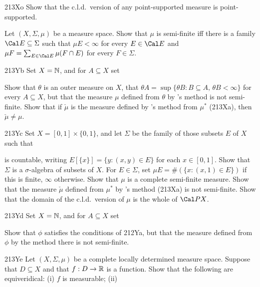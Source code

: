 {\spheader 213Xo Show that the c.l.d.\ version of any point-supported
measure is point-supported.

Let $(X,\Sigma,\mu)$ be a measure space.   Show that $\mu$
is semi-finite iff there is a family $\Cal E\subseteq\Sigma$ such that
$\mu E<\infty$ for every $E\in\Cal E$ and
$\mu F=\sum_{E\in\Cal E}\mu(F\cap E)$ for every $F\in\Sigma$.

\spheader 213Yb
Set $X=\Bbb N$, and for $A\subseteq X$ set


\noindent Show that $\theta$ is an outer measure on $X$, that
$\theta A=\sup\{\theta B:B\subseteq A,\,\theta B<\infty\}$ for every
$A\subseteq X$, but that the measure $\mu$ defined from $\theta$ by
\Caratheodory's
method is not semi-finite.   Show that if $\check\mu$ is the measure
defined by \Caratheodory's method from $\mu^*$ (213Xa), then
$\check\mu\ne\mu$.

\spheader 213Yc Set $X=[0,1]\times\{0,1\}$, and let
$\Sigma$ be the family of those subsets $E$ of $X$ such that


\noindent is countable, writing $E[\{x\}]=\{y:(x,y)\in E\}$ for each
$x\in[0,1]$.   Show that $\Sigma$ is a $\sigma$-algebra of subsets of
$X$.   For $E\in\Sigma$, set $\mu E=\#(\{x:(x,1)\in E\})$ if this is
finite, $\infty$ otherwise.   Show that $\mu$ is a complete semi-finite
measure.   Show that the measure $\check\mu$ defined from $\mu^*$ by
\Caratheodory's method (213Xa) is not semi-finite.   Show that the
domain of the c.l.d.\ version of $\mu$ is the whole of $\Cal PX$.

\spheader 213Yd Set $X=\Bbb N$, and for $A\subseteq X$ set


\noindent Show that $\phi$ satisfies the conditions of 212Ya,
but that the measure defined from $\phi$ by the method there is not
semi-finite.

\spheader 213Ye Let $(X,\Sigma,\mu)$ be a complete locally
determined measure space.   Suppose that $D\subseteq X$ and that
$f:D\to\Bbb R$ is a function.   Show that the following are equiveridical:
(i) $f$ is measurable;  (ii)

}
